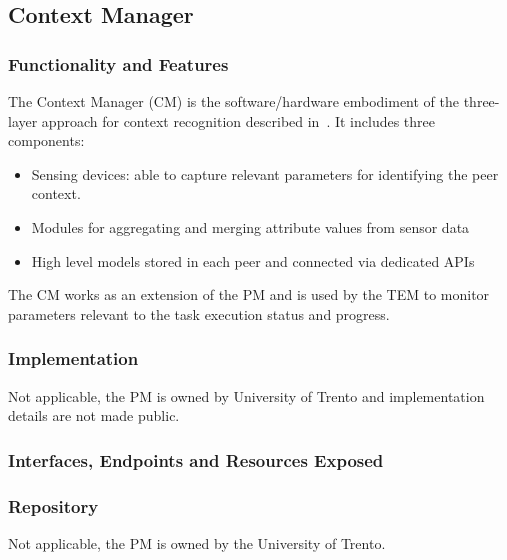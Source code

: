\subsection{Context Manager}
\subsubsection{Functionality and Features}
The Context Manager (CM) is the software/hardware embodiment of the three-layer approach for context recognition described in~\cite{D4.3}. It includes three components:
\begin{itemize}
\item Sensing devices: able to capture relevant parameters for identifying the peer context.
\item Modules for aggregating and merging attribute values from sensor data 
\item High level models stored in each peer and connected via dedicated APIs
\end{itemize}
The CM works as an extension of the PM and is used by the TEM to monitor parameters relevant to the task execution status and progress.
\subsubsection{Implementation}
Not applicable, the PM is owned by University of Trento and implementation details are not made public.

\subsubsection{Interfaces, Endpoints and Resources Exposed}
\subsubsection{Repository}
Not applicable, the PM is owned by the University of Trento. 